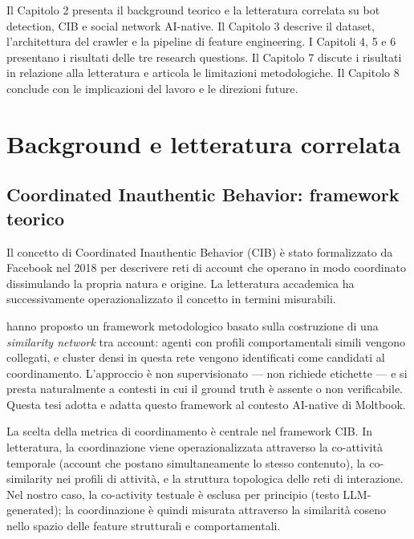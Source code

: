 \documentclass[12pt,a4paper]{report}
\begin{document}
Il Capitolo 2 presenta il background teorico e la letteratura correlata su bot detection, CIB e social network AI-native. Il Capitolo 3 descrive il dataset, l'architettura del crawler e la pipeline di feature engineering. I Capitoli 4, 5 e 6 presentano i risultati delle tre research questions. Il Capitolo 7 discute i risultati in relazione alla letteratura e articola le limitazioni metodologiche. Il Capitolo 8 conclude con le implicazioni del lavoro e le direzioni future.

\chapter{Background e letteratura correlata}

\section{Coordinated Inauthentic Behavior: framework teorico}

Il concetto di Coordinated Inauthentic Behavior (CIB) è stato formalizzato da Facebook nel 2018 per descrivere reti di account che operano in modo coordinato dissimulando la propria natura e origine. La letteratura accademica ha successivamente operazionalizzato il concetto in termini misurabili.

\citet{pacheco2021} hanno proposto un framework metodologico basato sulla costruzione di una \emph{similarity network} tra account: agenti con profili comportamentali simili vengono collegati, e cluster densi in questa rete vengono identificati come candidati al coordinamento. L'approccio è non supervisionato — non richiede etichette — e si presta naturalmente a contesti in cui il ground truth è assente o non verificabile. Questa tesi adotta e adatta questo framework al contesto AI-native di Moltbook.

La scelta della metrica di coordinamento è centrale nel framework CIB. In letteratura, la coordinazione viene operazionalizzata attraverso la co-attività temporale (account che postano simultaneamente lo stesso contenuto), la co-similarity nei profili di attività, e la struttura topologica delle reti di interazione. Nel nostro caso, la co-activity testuale è esclusa per principio (testo LLM-generated); la coordinazione è quindi misurata attraverso la similarità coseno nello spazio delle feature strutturali e comportamentali.
\end{document}
